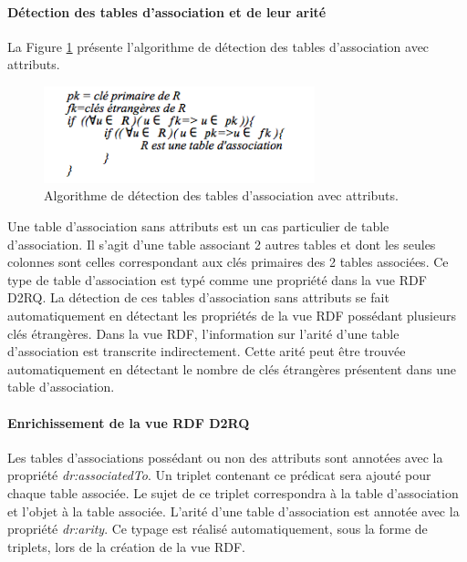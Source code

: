 \paragraph*{Détection des tables d'association et de leur arité}
La Figure \ref{algo} présente l'algorithme de détection des tables d'association avec attributs.


\begin{figure}[!ht]
\begin{center}
	\includegraphics[width=0.7\textwidth]{Figures/algo-arite.png}
\end{center}
\caption{\label{algo} Algorithme de détection des tables d'association avec attributs.}
\end{figure}

Une table d'association sans attributs est un cas particulier de table d'association. Il s'agit d'une table associant 2 autres tables et dont les seules colonnes sont celles correspondant aux clés primaires des 2 tables associées. Ce type de table d'association est typé comme une propriété dans la vue RDF D2RQ. La détection de ces tables d'association sans attributs se fait automatiquement en détectant les propriétés de la vue RDF possédant plusieurs clés étrangères. Dans la vue RDF, l'information sur l'arité d'une table d'association est transcrite indirectement. Cette arité peut être trouvée automatiquement en détectant le nombre de clés étrangères présentent dans une table d'association.

\paragraph*{Enrichissement de la vue RDF D2RQ}
Les tables d'associations possédant ou non des attributs sont annotées avec la propriété \textit{dr:associatedTo}. Un triplet contenant ce prédicat sera ajouté pour chaque table associée. Le sujet de ce triplet correspondra à la table d'association et l'objet à la table associée. L’arité d’une table d’association est annotée avec la propriété \textit{dr:arity}. Ce typage est réalisé automatiquement, sous la forme de triplets, lors de la création de la vue RDF.

